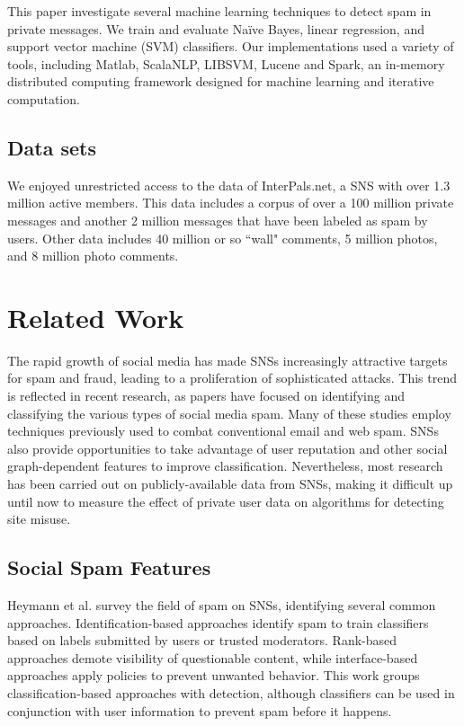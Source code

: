 \documentclass[preprint]{acm_proc_article-sp}
\begin{document}
This paper investigate several machine learning techniques to 
detect spam in private messages. We train and evaluate Na\"ive Bayes, 
linear regression, and support vector machine (SVM) 
classifiers. Our implementations used a variety of tools, 
including Matlab, ScalaNLP, LIBSVM, Lucene and Spark, 
an in-memory distributed computing framework designed for machine 
learning and iterative computation.

\subsection{Data sets}

We enjoyed unrestricted access to the data of InterPals.net, a SNS with 
over 1.3 million active members. This data includes a corpus of over a 
100 million private messages and another 2 million messages that have been 
labeled as spam by users. Other data includes 40 million or so ``wall" 
comments, 5 million photos, and 8 million photo comments. 

\section{Related Work} 

The rapid growth of social media has made SNSs increasingly attractive targets 
for spam and fraud, leading to a proliferation of sophisticated attacks. This 
trend is reflected in recent research, as papers 
have focused on identifying and classifying the various types of social media spam. 
Many of these studies employ techniques previously used to combat conventional 
email and web spam. SNSs also provide opportunities to take advantage of user 
reputation and other social graph-dependent features to improve classification. 
Nevertheless, most research has been carried out on publicly-available data 
from SNSs, making it difficult up until now to measure the effect of private user 
data on algorithms for detecting site misuse.

\subsection{Social Spam Features}

Heymann et al. \cite{heymann} survey the field of spam on SNSs, identifying 
several common approaches. Identification-based approaches identify spam to 
train classifiers based on labels submitted by users or trusted moderators. 
Rank-based approaches demote visibility of questionable content, while interface-based 
approaches apply policies to prevent unwanted behavior. This work groups 
classification-based approaches with detection, although classifiers can be 
used in conjunction with user information to prevent spam before it happens.
\end{document}

